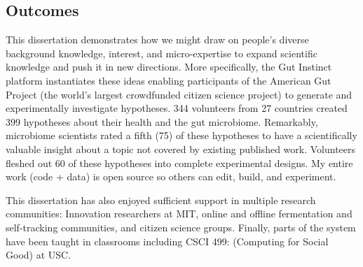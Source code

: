 
\subsection{Outcomes}


This dissertation demonstrates how we might draw on people’s diverse background knowledge, interest, and micro-expertise to expand scientific knowledge and push it in new directions. More specifically, the Gut Instinct platform instantiates these ideas enabling participants of the American Gut Project (the world’s largest crowdfunded citizen science project) to generate and experimentally investigate hypotheses. 344 volunteers from 27 countries created 399 hypotheses about their health and the gut microbiome. Remarkably, microbiome scientists rated a fifth (75) of these hypotheses to have a scientifically valuable insight about a topic not covered by existing published work. Volunteers fleshed out 60 of these hypotheses into complete experimental designs. My entire work (code + data) is open source so others can edit, build, and experiment.

This dissertation has also enjoyed sufficient support in multiple research communities: Innovation researchers at MIT, online and offline fermentation and self-tracking communities, and citizen science groups. Finally, parts of the system have been taught in classrooms including CSCI 499: (Computing for Social Good) at USC. 

